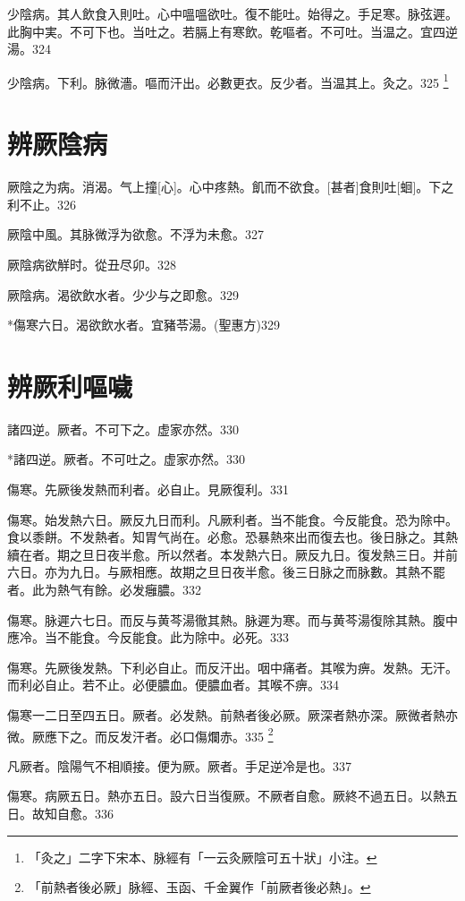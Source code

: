 \documentclass[12pt,oneside,UTF8,b5paper]{ctexbook}她她她她她她她
\begin{document}
少陰病。其人飲食入則吐。心中嗢嗢欲吐。復不能吐。始得之。手足寒。脉弦遲。此胸中実。不可下也。当吐之。若膈上有寒飲。乾嘔者。不可吐。当温之。宜四逆湯。324

少陰病。下利。脉微濇。嘔而汗出。必數更衣。反少者。当温其上。灸之。325
	\footnote{「灸之」二字下宋本、脉經有「一云灸厥陰可五十狀」小注。}

\chapter{辨厥陰病}

厥陰之为病。消渴。气上撞[心]。心中疼熱。飢而不欲食。[甚者]食則吐[蛔]。下之利不止。326

厥陰中風。其脉微浮为欲愈。不浮为未愈。327

厥陰病欲觧时。從丑尽卯。328

厥陰病。渴欲飲水者。少少与之即愈。329

*傷寒六日。渴欲飲水者。宜豬苓湯。(聖惠方)329

\chapter{辨厥利嘔噦}

諸四逆。厥者。不可下之。虚家亦然。330

*諸四逆。厥者。不可吐之。虚家亦然。330

傷寒。先厥後发熱而利者。必自止。見厥復利。331

傷寒。始发熱六日。厥反九日而利。凡厥利者。当不能食。今反能食。恐为除中。食以黍餅。不发熱者。知胃气尚在。必愈。恐暴熱來出而復去也。後日脉之。其熱續在者。期之旦日夜半愈。所以然者。本发熱六日。厥反九日。復发熱三日。并前六日。亦为九日。与厥相應。故期之旦日夜半愈。後三日脉之而脉數。其熱不罷者。此为熱气有餘。必发癰膿。332

傷寒。脉遲六七日。而反与黄芩湯徹其熱。脉遲为寒。而与黄芩湯復除其熱。腹中應冷。当不能食。今反能食。此为除中。必死。333

傷寒。先厥後发熱。下利必自止。而反汗出。咽中痛者。其喉为痹。发熱。无汗。而利必自止。若不止。必便膿血。便膿血者。其喉不痹。334

傷寒一二日至四五日。厥者。必发熱。前熱者後必厥。厥深者熱亦深。厥微者熱亦微。厥應下之。而反发汗者。必口傷爛赤。335
	\footnote{「前熱者後必厥」脉經、玉函、千金翼作「前厥者後必熱」。}

凡厥者。陰陽气不相順接。便为厥。厥者。手足逆冷是也。337

傷寒。病厥五日。熱亦五日。設六日当復厥。不厥者自愈。厥終不過五日。以熱五日。故知自愈。336
\end{document}
